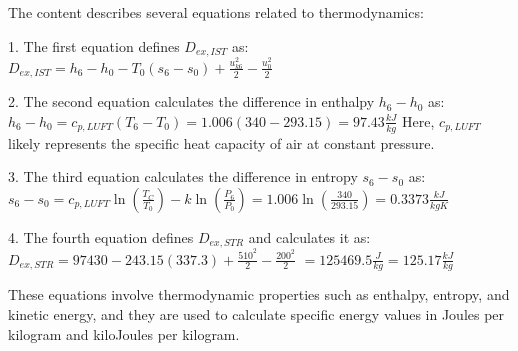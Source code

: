 The content describes several equations related to thermodynamics:

1. The first equation defines \( D_{ex,IST} \) as:
   \( D_{ex,IST} = h_6 - h_0 - T_0 (s_6 - s_0) + \frac{u_{k6}^2}{2} - \frac{u_0^2}{2} \)

2. The second equation calculates the difference in enthalpy \( h_6 - h_0 \) as:
   \( h_6 - h_0 = c_{p,LUFT} (T_6 - T_0) = 1.006 (340 - 293.15) = 97.43 \frac{kJ}{kg} \)
   Here, \( c_{p,LUFT} \) likely represents the specific heat capacity of air at constant pressure.

3. The third equation calculates the difference in entropy \( s_6 - s_0 \) as:
   \( s_6 - s_0 = c_{p,LUFT} \ln \left( \frac{T_C}{T_0} \right) - k \ln \left( \frac{P_6}{P_0} \right) = 1.006 \ln \left( \frac{340}{293.15} \right) = 0.3373 \frac{kJ}{kgK} \)

4. The fourth equation defines \( D_{ex,STR} \) and calculates it as:
   \( D_{ex,STR} = 97430 - 243.15 (337.3) + \frac{510^2}{2} - \frac{200^2}{2} \)
   \( = 125469.5 \frac{J}{kg} = 125.17 \frac{kJ}{kg} \)

These equations involve thermodynamic properties such as enthalpy, entropy, and kinetic energy, and they are used to calculate specific energy values in Joules per kilogram and kiloJoules per kilogram.